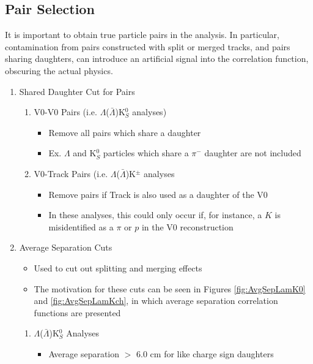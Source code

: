\documentclass[../AnalysisNoteJBuxton.tex]{subfiles}
\begin{document}
\subsection{Pair Selection}
\label{PairSelection}

It is important to obtain true particle pairs in the analysis.  In particular, contamination from pairs constructed with split or merged tracks, and pairs sharing daughters, can introduce an artificial signal into the correlation function, obscuring the actual physics.

\begin{enumerate}
 \item Shared Daughter Cut for Pairs
 \begin{enumerate}
  \item V0-V0 Pairs (i.e. $\Lambda$($\bar{\Lambda}$)K$^{0}_{S}$ analyses)
  \begin{itemize}
   \item Remove all pairs which share a daughter 
   \item Ex. $\Lambda$ and K$^{0}_{S}$ particles which share a $\pi^{-}$ daughter are not included
  \end{itemize}
  \item V0-Track Pairs (i.e. $\Lambda$($\bar{\Lambda}$)K$^{\pm}$ analyses
  \begin{itemize}
   \item Remove pairs if Track is also used as a daughter of the V0
   \item In these analyses, this could only occur if, for instance, a $K$ is misidentified as a $\pi$ or $p$ in the V0 reconstruction
  \end{itemize}
 \end{enumerate}
 \item Average Separation Cuts
 \begin{itemize}
  \item Used to cut out splitting and merging effects
  \item The motivation for these cuts can be seen in Figures \ref{fig:AvgSepLamK0} and \ref{fig:AvgSepLamKch}, in which average separation correlation functions are presented
 \end{itemize}
 \begin{enumerate}
  \item $\Lambda$($\bar{\Lambda}$)K$^{0}_{S}$ Analyses
  \begin{itemize}
   \item Average separation $>$ 6.0 cm for like charge sign daughters
   \begin{itemize}

\end{itemize}
\end{itemize}
\end{enumerate}
\end{enumerate}
\end{document}
